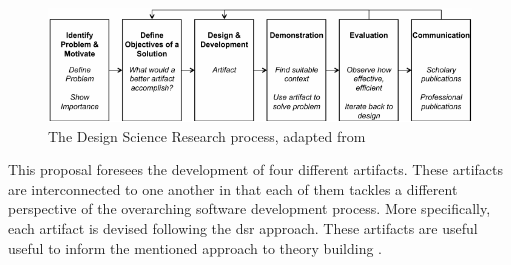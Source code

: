 \documentclass[a4paper,11pt]{article}
\begin{document}
\begin{figure}[h]
	\centering
	\includegraphics[width=.8\linewidth]{figures/DS-process}
	\caption{The Design Science Research process, adapted from~\cite{Peffers2008}}
	\label{fig:DS-process}
\end{figure}


%
%

This proposal foresees the development of four different artifacts. These artifacts are interconnected to one another in that each of them tackles a different perspective of the overarching software development process. More specifically, each artifact is devised following the \gls{dsr} approach. These artifacts are useful useful to inform the mentioned approach to theory building \cite{Berente2018}.
\end{document}
